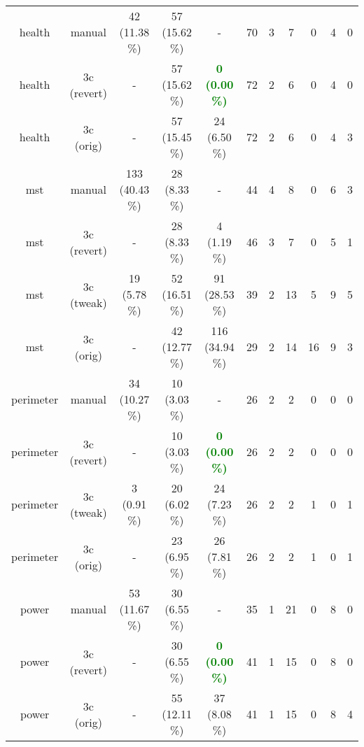 \begin{tabular}{c|c|ccc|cccc|c|c}
\rowcolor[rgb]{0.8,0.8,0.8}
 health & manual & 42 (11.38 \%) & 57 (15.62 \%) & - & 70 & 3 & 7 & 0 & 4 & 0 \\

\rowcolor[rgb]{0.8,0.8,0.8}
 health & 3c (revert) & - & 57 (15.62 \%) & \textcolor{green}{\textbf{0 (0.00 \%)}} & 72 & 2 & 6 & 0 & 4 & 0 \\

\rowcolor[rgb]{0.8,0.8,0.8}
 health & 3c (orig) & - & 57 (15.45 \%) & 24 (6.50 \%) & 72 & 2 & 6 & 0 & 4 & 3 \\

\rowcolor{white}
 mst & manual & 133 (40.43 \%) & 28 (8.33 \%) & - & 44 & 4 & 8 & 0 & 6 & 3 \\

\rowcolor{white}
 mst & 3c (revert) & - & 28 (8.33 \%) & 4 (1.19 \%) & 46 & 3 & 7 & 0 & 5 & 1 \\

\rowcolor{white}
 mst & 3c (tweak) & 19 (5.78 \%) & 52 (16.51 \%) & 91 (28.53 \%) & 39 & 2 & 13 & 5 & 9 & 5 \\

\rowcolor{white}
 mst & 3c (orig) & - & 42 (12.77 \%) & 116 (34.94 \%) & 29 & 2 & 14 & 16 & 9 & 3 \\

\rowcolor[rgb]{0.8,0.8,0.8}
 perimeter & manual & 34 (10.27 \%) & 10 (3.03 \%) & - & 26 & 2 & 2 & 0 & 0 & 0 \\

\rowcolor[rgb]{0.8,0.8,0.8}
 perimeter & 3c (revert) & - & 10 (3.03 \%) & \textcolor{green}{\textbf{0 (0.00 \%)}} & 26 & 2 & 2 & 0 & 0 & 0 \\

\rowcolor[rgb]{0.8,0.8,0.8}
 perimeter & 3c (tweak) & 3 (0.91 \%) & 20 (6.02 \%) & 24 (7.23 \%) & 26 & 2 & 2 & 1 & 0 & 1 \\

\rowcolor[rgb]{0.8,0.8,0.8}
 perimeter & 3c (orig) & - & 23 (6.95 \%) & 26 (7.81 \%) & 26 & 2 & 2 & 1 & 0 & 1 \\

\rowcolor{white}
 power & manual & 53 (11.67 \%) & 30 (6.55 \%) & - & 35 & 1 & 21 & 0 & 8 & 0 \\

\rowcolor{white}
 power & 3c (revert) & - & 30 (6.55 \%) & \textcolor{green}{\textbf{0 (0.00 \%)}} & 41 & 1 & 15 & 0 & 8 & 0 \\

\rowcolor{white}
 power & 3c (orig) & - & 55 (12.11 \%) & 37 (8.08 \%) & 41 & 1 & 15 & 0 & 8 & 4 \\


\end{tabular}
